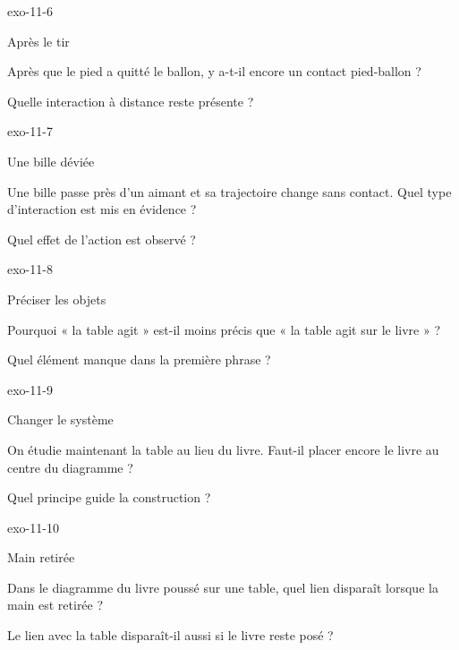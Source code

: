 \documentclass[12pt,twoside,openany]{book}
\begin{document}
\begin{blocLivre}{exo-11-6}
\begin{exercice}[2]{Après le tir}
\begin{questions}
\item Après que le pied a quitté le ballon, y a-t-il encore un contact pied-ballon ?
\item Quelle interaction à distance reste présente ?
\end{questions}
\end{exercice}\end{blocLivre}
\begin{blocLivre}{exo-11-7}
\begin{exercice}[2]{Une bille déviée}
\begin{questions}
\item Une bille passe près d’un aimant et sa trajectoire change sans contact. Quel type d’interaction est mis en évidence ?
\item Quel effet de l’action est observé ?
\end{questions}
\end{exercice}\end{blocLivre}
\begin{blocLivre}{exo-11-8}
\begin{exercice}[2]{Préciser les objets}
\begin{questions}
\item Pourquoi « la table agit » est-il moins précis que « la table agit sur le livre » ?
\item Quel élément manque dans la première phrase ?
\end{questions}
\end{exercice}\end{blocLivre}
\begin{blocLivre}{exo-11-9}
\begin{exercice}[2]{Changer le système}
\begin{questions}
\item On étudie maintenant la table au lieu du livre. Faut-il placer encore le livre au centre du diagramme ?
\item Quel principe guide la construction ?
\end{questions}
\end{exercice}\end{blocLivre}
\begin{blocLivre}{exo-11-10}
\begin{exercice}[2]{Main retirée}
\begin{questions}
\item Dans le diagramme du livre poussé sur une table, quel lien disparaît lorsque la main est retirée ?
\item Le lien avec la table disparaît-il aussi si le livre reste posé ?
\end{questions}
\end{exercice}\end{blocLivre}
\end{document}
